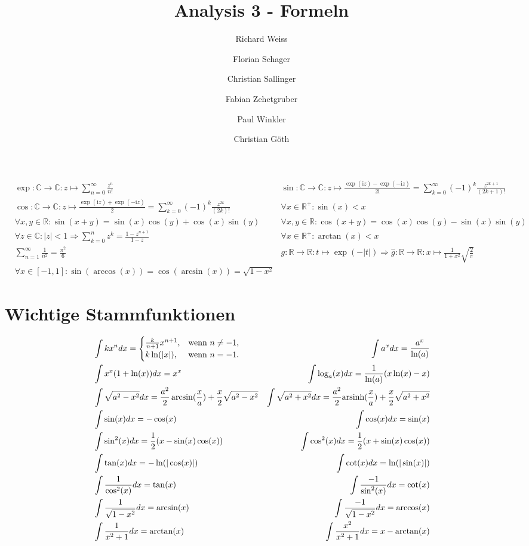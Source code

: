 \documentclass{article}
\title
{
  Analysis 3 - Formeln \\
  \vspace{4pt}
  \normalsize
  \textit{}
}
\author
{
  Richard Weiss       \and
  Florian Schager     \and
  Christian Sallinger \and
  Fabian Zehetgruber  \and
  Paul Winkler        \and
  Christian Göth
}
\date{}
\begin{document}
\maketitle

\begin{align*}
    &\exp: \mathbb{C} \to \mathbb{C}: z \mapsto \sum_{n=0}^\infty \frac{z^n}{n!} &  \sin: \mathbb{C} \to \mathbb{C}: z \mapsto \frac{\exp(\mathrm{i}z) - \exp(-\mathrm{i}z)}{2\mathrm{i}} = \sum_{k=0}^\infty (-1)^k \frac{z^{2k+1}}{(2k+1)!} \\
    &\cos: \mathbb{C} \to \mathbb{C}: z \mapsto  \frac{\exp(\mathrm{i}z) + \exp(-\mathrm{i}z)}{2} = \sum_{k=0}^\infty (-1)^k \frac{z^{2k}}{(2k)!} &  \forall x \in \mathbb{R}^+: \sin(x) < x \\
    &\forall x,y \in \mathbb{R}: \sin(x + y) = \sin(x)\cos(y) + \cos(x)\sin(y) &\forall x,y \in \mathbb{R}: \cos(x + y) = \cos(x)\cos(y) - \sin(x)\sin(y) \\
    &\forall z \in \mathbb{C}: \vert z \vert < 1 \Rightarrow \sum_{k=0}^n z^k = \frac{1 - z^{n+1}}{1-z} &  \forall x \in \mathbb{R}^+ : \arctan(x) < x \\
    &\sum_{n=1}^\infty \frac{1}{n^2} = \frac{\pi^2}{6} & g:\mathbb{R} \to \mathbb{R}: t \mapsto \exp(-\vert t \vert) \Rightarrow \hat{g}: \mathbb{R} \to \mathbb{R}: x \mapsto \frac{1}{1 + x^2} \sqrt{\frac{2}{\pi}} \\
    &\forall x \in [-1,1]: \sin(\arccos(x)) = \cos(\arcsin(x)) = \sqrt{1 - x^2}
\end{align*}
\section*{Wichtige Stammfunktionen}
\begin{align*}
  &\int kx^n dx = \begin{cases} \frac{k}{n+1}x^{n+1}, & \text{wenn } n \neq -1, \\
  k\ln (|x|), & \text{wenn } n = -1.
\end{cases}
 &\int a^x dx = \frac{a^x}{\ln (a)} \\
 &\int x^x(1+\ln(x)) dx = x^x
 &\int \log_a(x) dx = \frac{1}{\ln(a)}(x\ln(x) - x) \\
 &\int \sqrt{a^2-x^2} dx = \frac{a^2}{2}\arcsin(\frac{x}{a}) + \frac{x}{2}\sqrt{a^2-x^2}
 &\int \sqrt{a^2+x^2} dx = \frac{a^2}{2}\text{arsinh}(\frac{x}{a}) + \frac{x}{2}\sqrt{a^2+x^2} \\
 &\int \sin(x) dx = -\cos(x)
 &\int \cos(x) dx = \sin(x) \\
 &\int \sin^2(x) dx = \frac{1}{2}(x - \sin(x)\cos(x))
 &\int \cos^2(x) dx = \frac{1}{2}(x + \sin(x)\cos(x)) \\
 &\int \tan(x) dx = -\ln(|\cos(x)|)
 &\int \cot(x) dx = \ln(|\sin(x)|) \\
 &\int \frac{1}{\cos^2(x)} dx = \tan(x)
 &\int \frac{-1}{\sin^2(x)} dx = \cot(x) \\
 &\int \frac{1}{\sqrt{1-x^2}} dx = \arcsin(x)
 &\int \frac{-1}{\sqrt{1-x^2}} dx = \arccos(x) \\
 &\int \frac{1}{x^2 + 1} dx =  \arctan(x)
 &\int \frac{x^2}{x^2 + 1} dx = x - \arctan(x) \\
\end{align*}
\end{document}
